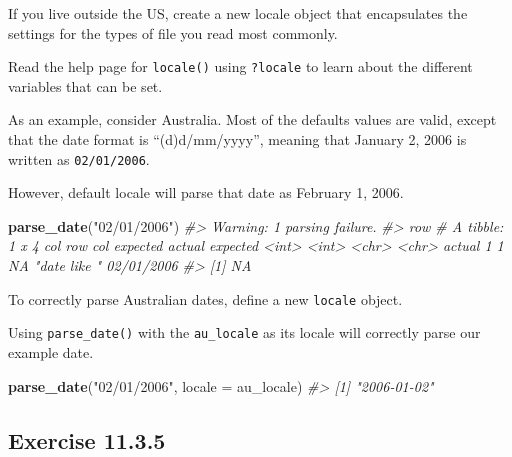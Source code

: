 \documentclass[]{book}
\newenvironment{Shaded}{\begin{snugshade}}{\end{snugshade}}
\newcommand{\CommentTok}[1]{\textcolor[rgb]{0.56,0.35,0.01}{\textit{#1}}}
\newcommand{\DataTypeTok}[1]{\textcolor[rgb]{0.13,0.29,0.53}{#1}}
\newcommand{\KeywordTok}[1]{\textcolor[rgb]{0.13,0.29,0.53}{\textbf{#1}}}
\newcommand{\NormalTok}[1]{#1}
\newcommand{\StringTok}[1]{\textcolor[rgb]{0.31,0.60,0.02}{#1}}
\theoremstyle{plain}
\theoremstyle{remark}
\begin{document}
If you live outside the US, create a new locale object that encapsulates
the settings for the types of file you read most commonly.

Read the help page for \texttt{locale()} using \texttt{?locale} to learn
about the different variables that can be set.

As an example, consider Australia. Most of the defaults values are
valid, except that the date format is ``(d)d/mm/yyyy'', meaning that
January 2, 2006 is written as \texttt{02/01/2006}.

However, default locale will parse that date as February 1, 2006.

\begin{Shaded}
\begin{Highlighting}[]
\KeywordTok{parse_date}\NormalTok{(}\StringTok{"02/01/2006"}\NormalTok{)}
\CommentTok{#> Warning: 1 parsing failure.}
\CommentTok{#> row # A tibble: 1 x 4 col     row   col expected     actual     expected   <int> <int> <chr>        <chr>      actual 1     1    NA "date like " 02/01/2006}
\CommentTok{#> [1] NA}
\end{Highlighting}
\end{Shaded}

To correctly parse Australian dates, define a new \texttt{locale}
object.

\begin{Shaded}
\end{Shaded}

Using \texttt{parse\_date()} with the \texttt{au\_locale} as its locale
will correctly parse our example date.

\begin{Shaded}
\begin{Highlighting}[]
\KeywordTok{parse_date}\NormalTok{(}\StringTok{"02/01/2006"}\NormalTok{, }\DataTypeTok{locale =}\NormalTok{ au_locale)}
\CommentTok{#> [1] "2006-01-02"}
\end{Highlighting}
\end{Shaded}

\hypertarget{exercise-11.3.5}{%
\subsection*{\texorpdfstring{Exercise
{11.3.5}}{Exercise 11.3.5}}\label{exercise-11.3.5}}
\end{document}
